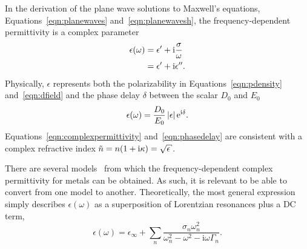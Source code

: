 In the derivation of the plane wave solutions to Maxwell's equations,
Equations~\ref{eqn:planewaves} and~\ref{eqn:planewavesh}, the
frequency-dependent permittivity is a complex parameter
\begin{align}
  \epsilon(\omega) & = \epsilon^\prime + {\mathrm{i}} \frac{\sigma}{\omega}   \\
                   & = \epsilon^\prime + {\mathrm{i}}\epsilon^{\prime\prime}.
  \label{eqn:complexpermittivity}
\end{align}
Physically, $\epsilon$ represents both the polarizability in
Equations~\ref{eqn:pdensity} and~\ref{eqn:dfield} and the phase delay
$\delta$ between the scalar $D_0$ and
$E_0$
\begin{equation}
  \epsilon(\omega) = \frac{D_0}{E_0} \,|\epsilon| \,{\mathrm{e}}^{{\mathrm{i}} \delta}.
  \label{eqn:phasedelay}
\end{equation}
Equations~\ref{eqn:complexpermittivity} and~\ref{eqn:phasedelay} are
consistent with a complex refractive index $\tilde{n} = n(1+\mi \kappa) =
\sqrt{\epsilon}$.

There are several models~\cite{rakic1998optical} from which
the frequency-dependent complex permittivity for metals can be obtained.
As such, it is relevant to be able to convert from one model to another.
Theoretically, the most general expression simply describes
$\epsilon(\omega)$ as a superposition of Lorentzian resonances plus a DC
term,
\begin{equation}
  \epsilon(\omega)= \epsilon_\infty+\sum_n \frac{\sigma_n \omega_n^2} {\omega_n^2-\omega^2-{\mathrm{i}}\omega\Gamma_n}.
  \label{eqn:meepdispersion}
\end{equation}

